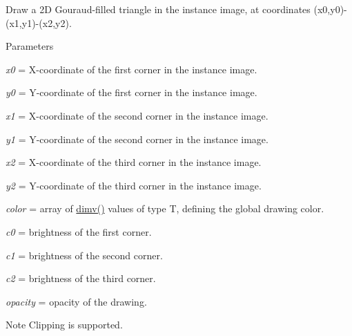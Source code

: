 Draw a 2D Gouraud-\/filled triangle in the instance image, at coordinates ({\ttfamily x0},{\ttfamily y0})-\/({\ttfamily x1},{\ttfamily y1})-\/({\ttfamily x2},{\ttfamily y2}). 


\begin{DoxyParams}{Parameters}
\item[{\em x0}]= X-\/coordinate of the first corner in the instance image. \item[{\em y0}]= Y-\/coordinate of the first corner in the instance image. \item[{\em x1}]= X-\/coordinate of the second corner in the instance image. \item[{\em y1}]= Y-\/coordinate of the second corner in the instance image. \item[{\em x2}]= X-\/coordinate of the third corner in the instance image. \item[{\em y2}]= Y-\/coordinate of the third corner in the instance image. \item[{\em color}]= array of \hyperlink{structcimg__library_1_1_c_img_ad30f8300f32a94a80e1e06c84a45de49}{dimv()} values of type {\ttfamily T}, defining the global drawing color. \item[{\em c0}]= brightness of the first corner. \item[{\em c1}]= brightness of the second corner. \item[{\em c2}]= brightness of the third corner. \item[{\em opacity}]= opacity of the drawing. \end{DoxyParams}
\begin{DoxyNote}{Note}
Clipping is supported. 
\end{DoxyNote}
